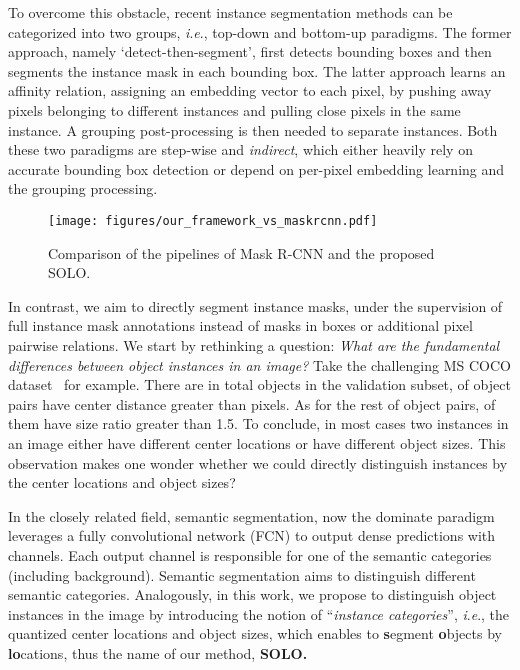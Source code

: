 \documentclass[runningheads]{llncs}
\def\OurMethod{{SOLO}\xspace}
\newcommand{\ie}{\textit{i}.\textit{e}.}
\begin{document}
To overcome this obstacle, recent instance segmentation methods can be categorized into two groups, \ie, top-down and bottom-up paradigms.
The former approach, namely `detect-then-segment', first detects
bounding boxes and then segments the instance mask
in each bounding box.
The latter approach learns an affinity relation,
assigning an embedding vector to each pixel, by pushing away pixels belonging to different instances and pulling close pixels in the same instance.
A grouping post-processing is then needed to separate instances.
Both these two paradigms are step-wise and {\it indirect}, which either heavily rely on
accurate bounding box detection or depend on per-pixel embedding learning and the grouping processing.

\iffalse
\begin{figure}[tbp]
\centering
\subfigure[Mask R-CNN]{
\texttt{[image: figures/maskrcnn\_framework.pdf]}
\label{fig:framework1}
}
\subfigure[\OurMethod]{
\texttt{[image: figures/our\_framework.pdf]}
\label{fig:framework2}
}
\caption{Comparison of the pipelines of Mask R-CNN and the proposed \OurMethod.}
\label{fig:framework_comparison}
\end{figure}
\fi

\begin{figure}[tbp]
\centering
\texttt{[image: figures/our\_framework\_vs\_maskrcnn.pdf]}
\caption{Comparison of the pipelines of Mask R-CNN and the proposed \OurMethod.}
\label{fig:framework_comparison}
\end{figure}

In contrast, we aim to directly segment instance masks, under the supervision of full instance mask annotations instead of masks in boxes or
additional
pixel
pairwise
relations. We start by rethinking a question:
\textit{What are the fundamental differences between object instances in an image?}
Take the challenging MS COCO dataset~\cite{coco} for example.
There are in total
 objects in the validation subset,  of object pairs have center distance greater than  pixels.
As for the rest  of object pairs,  of them have size ratio greater than 1.5.
To conclude, in most cases two instances in an image either have different center locations or have different object sizes.
This observation makes one wonder whether we could directly distinguish instances by the center locations and object sizes?


In the closely related field, semantic segmentation,  now
the dominate paradigm leverages a fully convolutional network (FCN) to output dense predictions with  channels. Each output channel is responsible for one of the semantic categories (including background).
Semantic segmentation aims to distinguish different semantic categories.
Analogously,
in this work, we propose to distinguish object instances
in the image
by introducing
the notion of ``\textit{instance categories}'', \ie, the quantized center locations and object sizes, which enables to \textbf{s}egment \textbf{o}bjects by \textbf{lo}cations, thus the name of our method,
{\bf
\OurMethod.
}
\end{document}
